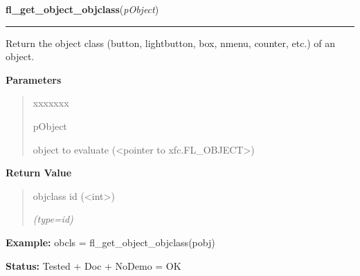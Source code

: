 \hspace{.8\funcindent}\begin{boxedminipage}{\funcwidth}

    \raggedright \textbf{fl\_get\_object\_objclass}(\textit{pObject})

    \vspace{-1.5ex}

    \rule{\textwidth}{0.5\fboxrule}
\setlength{\parskip}{2ex}
    Return the object class (button, lightbutton, box, nmenu, counter, 
    etc.) of an object.

\setlength{\parskip}{1ex}
      \textbf{Parameters}
      \vspace{-1ex}

      \begin{quote}
        \begin{Ventry}{xxxxxxx}

          \item[pObject]

          object to evaluate ({\textless}pointer to 
          xfc.FL\_OBJECT{\textgreater})

        \end{Ventry}

      \end{quote}

      \textbf{Return Value}
    \vspace{-1ex}

      \begin{quote}
      objclass id ({\textless}int{\textgreater})

      {\it (type=id)}

      \end{quote}

\textbf{Example:} obcls = fl\_get\_object\_objclass(pobj)



\textbf{Status:} Tested + Doc + NoDemo = OK



    \end{boxedminipage}

    \label{xformslib:library:fl_get_object_type}

    \vspace{0.5ex}

